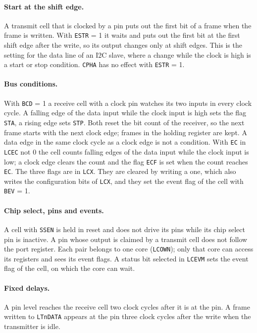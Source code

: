 \documentclass[10pt,a4paper]{article}
\newcommand{\reg}[1]{\texttt{#1}}
\begin{document}
\paragraph{Start at the shift edge.} A transmit cell that is clocked by a pin puts out the first bit of a frame
when the frame is written. With \reg{ESTR} = 1 it waits and puts out the first bit at the first shift edge after
the write, so its output changes only at shift edges. This is the setting for the data line of an I2C slave,
where a change while the clock is high is a start or stop condition. \reg{CPHA} has no effect with \reg{ESTR} = 1.

\paragraph{Bus conditions.} With \reg{BCD} = 1 a receive cell with a clock pin watches its two inputs in every
clock cycle. A falling edge of the data input while the clock input is high sets the flag \reg{STA}, a rising
edge sets \reg{STP}. Both reset the bit count of the receiver, so the next frame starts with the next clock
edge; frames in the holding register are kept. A data edge in the same clock cycle as a clock edge is not a
condition. With \reg{EC} in \reg{LCEC} not 0 the cell counts falling edges of the data input while the clock
input is low; a clock edge clears the count and the flag \reg{ECF} is set when the count reaches \reg{EC}. The
three flags are in \reg{LCX}. They are cleared by writing a one, which also writes the configuration bits of
\reg{LCX}, and they set the event flag of the cell with \reg{BEV} = 1.

\paragraph{Chip select, pins and events.} A cell with \reg{SSEN} is held in reset and does not drive its pins
while its chip select pin is inactive. A pin whose output is claimed by a transmit cell does not follow the
port register. Each pair belongs to one core (\reg{LCOWN}); only that core can access its registers and sees its
event flags. A status bit selected in \reg{LCEVM} sets the event flag of the cell, on which the core can wait.

\paragraph{Fixed delays.} A pin level reaches the receive cell two clock cycles after it is at the pin. A frame
written to \reg{LTnDATA} appears at the pin three clock cycles after the write when the transmitter is idle.
\end{document}
